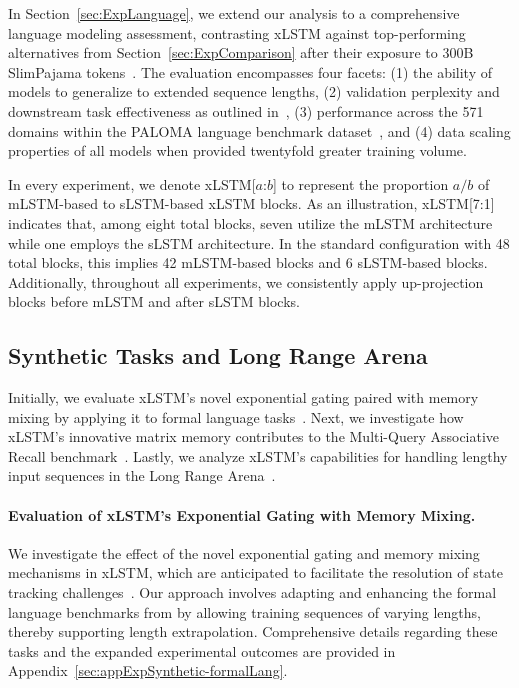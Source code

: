 In Section~\ref{sec:ExpLanguage}, we extend our analysis to a comprehensive language modeling assessment, contrasting xLSTM against top-performing alternatives from Section~\ref{sec:ExpComparison} after their exposure to 300B SlimPajama tokens~\citep{Soboleva:23}. The evaluation encompasses four facets: (1) the ability of models to generalize to extended sequence lengths, (2) validation perplexity and downstream task effectiveness as outlined in~\citep{Sutawika:24}, (3) performance across the 571 domains within the PALOMA language benchmark dataset~\citep{Magnusson:23arxivshort}, and (4) data scaling properties of all models when provided twentyfold greater training volume.

\label{sec:xlstm_blocks_notation}
In every experiment, we denote xLSTM[$a$:$b$] to represent the proportion $a/b$ of mLSTM-based to sLSTM-based xLSTM blocks. As an illustration, xLSTM[7:1] indicates that, among eight total blocks, seven utilize the mLSTM architecture while one employs the sLSTM architecture. In the standard configuration with 48 total blocks, this implies 42 mLSTM-based blocks and 6 sLSTM-based blocks. Additionally, throughout all experiments, we consistently apply up-projection blocks before mLSTM and after sLSTM blocks.

\subsection{Synthetic Tasks and Long Range Arena}
\label{sec:ExpSyntethic}
Initially, we evaluate xLSTM's novel exponential gating paired with memory mixing by applying it to formal language tasks~\citep{Deletang:23}. Next, we investigate how xLSTM's innovative matrix memory contributes to the Multi-Query Associative Recall benchmark~\citep{Arora:23arxiv}. Lastly, we analyze xLSTM's capabilities for handling lengthy input sequences in the Long Range Arena~\citep{Tay:21}.

\paragraph{Evaluation of xLSTM’s Exponential Gating with Memory Mixing.} We investigate the effect of the novel exponential gating and memory mixing mechanisms in xLSTM, which are anticipated to facilitate the resolution of state tracking challenges~\citep{Merrill:24, Merrill:23}. Our approach involves adapting and enhancing the formal language benchmarks from \citet{Deletang:23} by allowing training sequences of varying lengths, thereby supporting length extrapolation. Comprehensive details regarding these tasks and the expanded experimental outcomes are provided in Appendix~\ref{sec:appExpSynthetic-formalLang}. 

